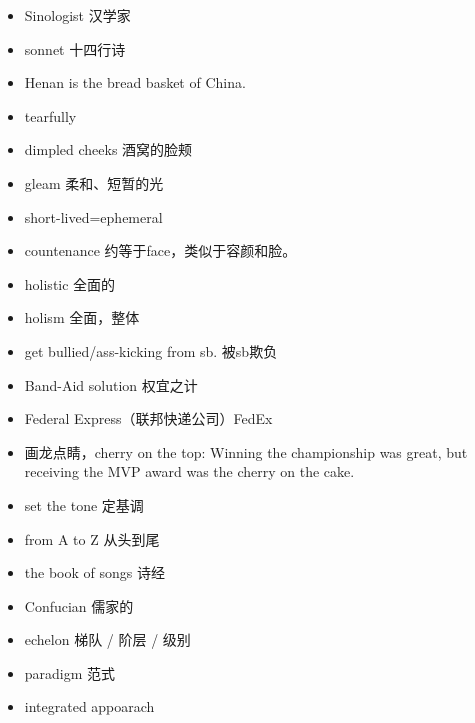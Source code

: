 \documentclass{ctexart}
\newif\ifpreface
\begin{document}
\large
\setlength{\baselineskip}{1.2em}
\ifpreface

\newgeometry{left=2cm,right=2cm,top=2cm,bottom=2cm}
\else
{}
\maketitle
\fi
\begin{itemize}
  \item Sinologist 汉学家
  \item sonnet 十四行诗
  \item Henan is the bread basket of China.
  \item tearfully
  \item dimpled cheeks 酒窝的脸颊
  \item gleam 柔和、短暂的光
  \item short-lived=ephemeral
  \item countenance 约等于face，类似于容颜和脸。
  \item holistic 全面的
  \item holism 全面，整体
  \item get bullied/ass-kicking from sb. 被sb欺负
  \item Band-Aid solution 权宜之计
  \item Federal Express（联邦快递公司）FedEx
  \item 画龙点睛，cherry on the top: Winning the championship was great, but receiving the MVP award was the cherry on the cake.
  \item set the tone 定基调
  \item from A to Z 从头到尾
  \item the book of songs 诗经
  \item Confucian 儒家的
  \item echelon 梯队 / 阶层 / 级别
  \item paradigm 范式
  \item integrated appoarach
\end{itemize}
\end{document}
